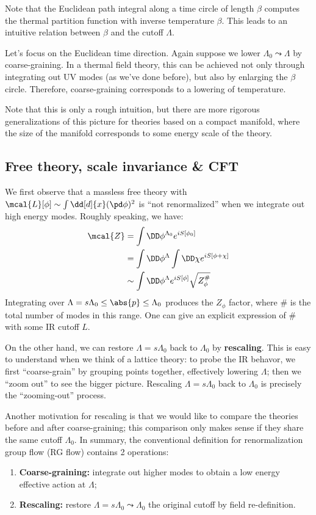 \documentclass[a4paper
	,10pt
]{article}
\begin{document}
	\newparagraph
	Note that the Euclidean path integral along a time circle of length $\beta$ computes the thermal partition function with inverse temperature $\beta$. This leads to an intuitive relation between $\beta$ and the cutoff $\Lambda$. 
	
	Let's focus on the Euclidean time direction. Again suppose we lower $\Lambda_0 \leadsto \Lambda$ by coarse-graining. In a thermal field theory, this can be achieved not only through integrating out UV modes (as we've done before), but also by enlarging the $\beta$ circle. Therefore, coarse-graining corresponds to a lowering of temperature. 
	
	Note that this is only a rough intuition, but there are more rigorous generalizations of this picture for theories based on a compact manifold, where the size of the manifold corresponds to some energy scale of the theory. 
\subsection{Free theory, scale invariance \& CFT}
	We first observe that a massless free theory with $
		\mcal{L}[\phi]
		\sim \int \dd[d]{x} (\pd\phi)^2
	$ is ``not renormalized'' when we integrate out high energy modes. Roughly speaking, we have:
	\begin{equation}
	\begin{aligned}
	  \mcal{Z}
	  &= \int \DD\phi^{\Lambda_0}
	      e^{iS[\phi_0]} \\
	  &= \int \DD\phi^{\Lambda}
	    \int \DD\chi
	      e^{iS[\phi + \chi]} \\
	  &\sim \int \DD\phi^{\Lambda}
	      e^{iS[\phi]}
	      \sqrt{Z_\phi^\#}
	\end{aligned}
	\label{eq:PI_free}
	\end{equation}
	Integrating over $\Lambda = s\Lambda_0 \le \abs{p} \le \Lambda_0$ produces the $Z_\phi$ factor, where $\#$ is the total number of modes in this range. One can give an explicit expression of $\#$ with some IR cutoff $L$.
	
	On the other hand, we can restore $\Lambda = s\Lambda_0$ back to $\Lambda_0$ by \textbf{rescaling}. This is easy to understand when we think of a lattice theory: to probe the IR behavor, we first ``coarse-grain'' by grouping points together, effectively lowering $\Lambda$; then we ``zoom out'' to see the bigger picture. Rescaling $\Lambda = s\Lambda_0$ back to $\Lambda_0$ is precisely the ``zooming-out'' process. 
	
	Another motivation for rescaling is that we would like to compare the theories before and after coarse-graining; this comparison only makes sense if they share the same cutoff $\Lambda_0$. In summary, the conventional definition for renormalization group flow (RG flow) contains 2 operations:
	\begin{enumerate}[noitemsep]
	\item \textbf{Coarse-graining:} integrate out higher modes to obtain a low energy effective action at $\Lambda$;
	\item \textbf{Rescaling:} restore $\Lambda = s\Lambda_0 \leadsto \Lambda_0$ the original cutoff by field re-definition.
	\end{enumerate}
	
\end{document}
